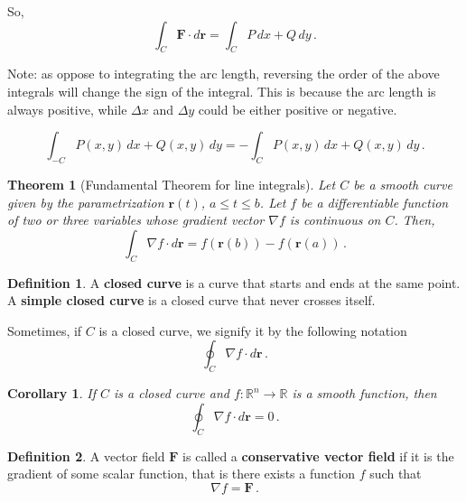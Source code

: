 \documentclass[
]{book}
\newtheorem{theorem}{Theorem}[chapter]
\newtheorem{corollary}{Corollary}[chapter]
\theoremstyle{definition}
\newtheorem{definition}{Definition}[chapter]
\theoremstyle{definition}
\theoremstyle{definition}
\theoremstyle{definition}
\theoremstyle{remark}
\begin{document}
So,
\begin{equation*}
    \int_C \mathbf{F} \cdot d \mathbf{r} 
    = \int_C P \, dx + Q \, dy \,.
\end{equation*}

Note: as oppose to integrating the arc length, reversing the order of the above integrals
will change the sign of the integral.
This is because the arc length is always positive, while \(\Delta x\) and \(\Delta y\) could be either positive
or negative.

\begin{equation*}
\int_{-C} P(x,y) \, dx + Q(x,y) \, dy 
= -\int_C P(x,y) \, dx + Q(x,y) \, dy \,.
\end{equation*}

\begin{theorem}[Fundamental Theorem for line integrals]
Let \(C\) be a smooth curve given by the parametrization \(\mathbf{r}(t)\),
\(a \leq t \leq b\).
Let \(f\) be a differentiable function of two or three
variables whose gradient vector \(\nabla f\) is continuous on \(C\).
Then,
\begin{equation*}
    \int_C \nabla f \cdot d\mathbf{r} = f(\mathbf{r}(b)) - f(\mathbf{r}(a)) \,.
\end{equation*}
\end{theorem}

\begin{definition}
A \textbf{closed curve} is a curve that starts and ends at the same point.
A \textbf{simple closed curve} is a closed curve that never crosses itself.
\end{definition}

Sometimes, if \(C\) is a closed curve, we signify it by the following notation
\begin{equation*}
    \oint_C \nabla f \cdot d\mathbf{r} \,.
\end{equation*}

\begin{corollary}
If \(C\) is a closed curve and \(f:\mathbb{R}^n \to \mathbb{R}\) is a smooth function,
then
\begin{equation*}
    \oint_C \nabla f \cdot d\mathbf{r}  = 0 \,.
\end{equation*}
\end{corollary}

\begin{definition}
A vector field \(\mathbf{F}\) is called a \textbf{conservative vector field}
if it is the gradient of some scalar function, that is there exists
a function \(f\) such that
\begin{equation*}
    \nabla f = \mathbf{F} \,.
\end{equation*}
\end{definition}
\end{document}
